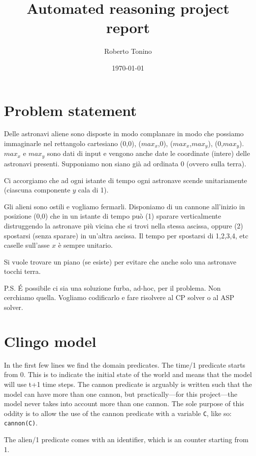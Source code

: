 \documentclass[11pt]{article}
\title{Automated reasoning project report}
\author{Roberto Tonino}
\date{\today}
\begin{document}
\maketitle


\section{Problem statement}

Delle astronavi aliene sono disposte in modo complanare in modo che possiamo immaginarle nel rettangolo cartesiano (0,0), ($max_x$,0), ($max_x$,$max_y$), (0,$max_y$).
$max_x$ e $max_y$ sono dati di input e vengono anche date le coordinate (intere) delle astronavi presenti.
Supponiamo non siano già ad ordinata 0 (ovvero sulla terra).

Ci accorgiamo che ad ogni istante di tempo ogni astronave scende unitariamente (ciascuna componente $y$ cala di 1).

Gli alieni sono ostili e vogliamo fermarli.
Disponiamo di un cannone all'inizio in posizione (0,0) che in un istante di tempo può (1) sparare verticalmente distruggendo la astronave più vicina che si trovi nella stessa ascissa, oppure (2) spostarsi (senza sparare) in un'altra ascissa.
Il tempo per spostarsi di 1,2,3,4, etc caselle sull'asse $x$ è sempre unitario.

Si vuole trovare un piano (se esiste) per evitare che anche solo una astronave tocchi terra.

P.S. \'E possibile ci sia una soluzione furba, ad-hoc, per il problema.
Non cerchiamo quella.
Vogliamo codificarlo e fare risolvere al CP solver o al ASP solver.

\section{Clingo model}

In the first few lines we find the domain predicates.
The time/1 predicate starts from 0.
This is to indicate the initial state of the world and means that the model will use t+1 time steps.
The cannon predicate is arguably is written such that the model can have more than one cannon, but practically---for this project---the model never takes into account more than one cannon.
The sole purpose of this oddity is to allow the use of the cannon predicate with a variable \texttt{C}, like so: \texttt{cannon(C)}.

The alien/1 predicate comes with an identifier, which is an counter starting from 1.
\end{document}
